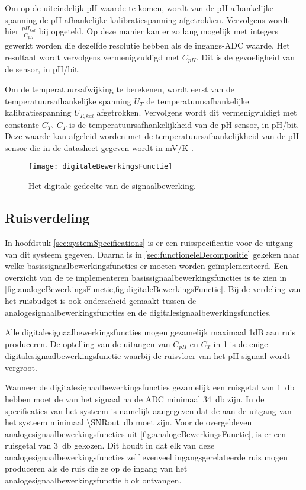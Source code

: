 Om op de uiteindelijk pH waarde te komen, wordt van de pH-afhankelijke spanning de pH-afhankelijke kalibratiespanning afgetrokken. Vervolgens wordt hier $\frac{pH_{kal}}{C_{pH}}$ bij opgeteld. Op deze manier kan er zo lang mogelijk met integers gewerkt worden die dezelfde resolutie hebben als de ingangs-ADC waarde. Het resultaat wordt vervolgens vermenigvuldigd met $C_{pH}$. Dit is de gevoeligheid van de sensor, in pH/bit.

Om de temperatuursafwijking te berekenen, wordt eerst van de temperatuursafhankelijke spanning $U_T$ de temperatuursafhankelijke kalibratiespanning $U_{T,kal}$ afgetrokken. Vervolgens wordt dit vermenigvuldigt met constante $C_T$. $C_T$ is de temperatuursafhankelijkheid van de pH-sensor, in pH/bit. Deze waarde kan afgeleid worden met de temperatuursafhankelijkheid van de pH-sensor die in de datasheet gegeven wordt in mV/K \cite{isfet}.

\begin{figure}[!htbp]
    \centering
    \texttt{[image: digitaleBewerkingsFunctie]}
    \caption{Het digitale gedeelte van de signaalbewerking.}
    \label{fig:digitaleBewerkingsFunctie}
\end{figure}


\subsection{Ruisverdeling}
In hoofdstuk \ref{sec:systemSpecifications} is er een ruisspecificatie voor de uitgang van dit systeem gegeven. Daarna is in \cref{sec:functioneleDecompositie} gekeken naar welke basissignaalbewerkingsfuncties er moeten worden geïmplementeerd. Een overzicht van de te implementeren basissignaalbewerkingsfuncties is te zien in \cref{fig:analogeBewerkingsFunctie,fig:digitaleBewerkingsFunctie}. Bij de verdeling van het ruisbudget is ook onderscheid gemaakt tussen de analogesignaalbewerkingsfuncties en de digitalesignaalbewerkingsfuncties.

Alle digitalesignaalbewerkingsfuncties mogen gezamelijk maximaal 1dB aan ruis produceren. De optelling van de uitangen van $C_{pH}$ en $C_T$ in \cref{fig:digitaleBewerkingsFunctie} is de enige digitalesignaalbewerkingsfunctie waarbij de ruisvloer van het pH signaal wordt vergroot.

Wanneer de digitalesignaalbewerkingsfuncties gezamelijk een ruisgetal van \qty{1}{\decibel} hebben moet de \SNR van het signaal na de ADC minimaal \qty{34}{\decibel} zijn. In de specificaties van het systeem is namelijk aangegeven dat de \SNR aan de uitgang van het systeem minimaal \qty{\SNRout}{\decibel} moet zijn. Voor de overgebleven analogesignaalbewerkingsfuncties uit \cref{fig:analogeBewerkingsFunctie}, is er een ruisgetal van \qty{3}{\decibel} gekozen. Dit houdt in dat elk van deze analogesignaalbewerkingsfuncties zelf evenveel ingangsgerelateerde ruis mogen produceren als de ruis die ze op de ingang van het analogesignaalbewerkingsfunctie blok ontvangen.

